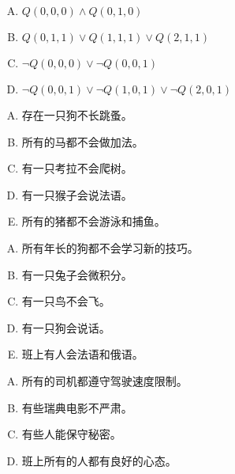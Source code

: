 {{        %
        \begin{practices}
            \begin{enumerate}[A.]
                \item $Q(0, 0, 0) \wedge Q(0, 1, 0)$
                \item $Q(0, 1, 1) \vee Q(1, 1, 1) \vee Q(2, 1, 1)$
                \item $\neg Q(0, 0, 0) \vee \neg Q(0, 0, 1)$
                \item $\neg Q(0, 0, 1) \vee \neg Q(1, 0, 1) \vee \neg Q(2, 0, 1)$
            \end{enumerate}
        \end{practices}

        \begin{practices}
            \begin{enumerate}[A.]
                \item 存在一只狗不长跳蚤。
                \item 所有的马都不会做加法。
                \item 有一只考拉不会爬树。
                \item 有一只猴子会说法语。
                \item 所有的猪都不会游泳和捕鱼。
            \end{enumerate}
        \end{practices}

        \begin{practices}
            \begin{enumerate}[A.]
                \item 所有年长的狗都不会学习新的技巧。
                \item 有一只兔子会微积分。
                \item 有一只鸟不会飞。
                \item 有一只狗会说话。
                \item 班上有人会法语和俄语。
            \end{enumerate}
        \end{practices}

        \begin{practices}
            \begin{enumerate}[A.]
                \item 所有的司机都遵守驾驶速度限制。
                \item 有些瑞典电影不严肃。
                \item 有些人能保守秘密。
                \item 班上所有的人都有良好的心态。
            \end{enumerate}
        \end{practices}

}}
